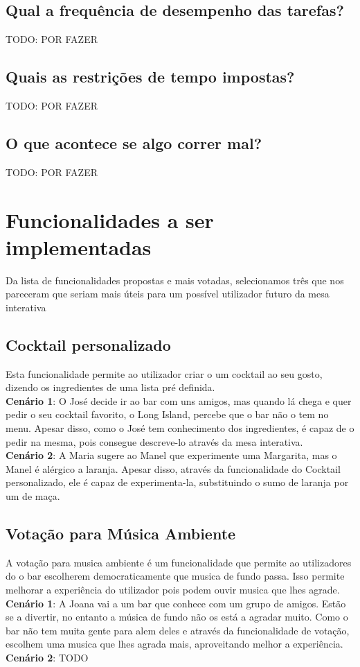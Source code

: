\documentclass{article}
\begin{document}
\subsection*{Qual a frequência de desempenho das tarefas?}
TODO: POR FAZER
\subsection*{Quais as restrições de tempo impostas?}
TODO: POR FAZER
\subsection*{O que acontece se algo correr mal?}
TODO: POR FAZER
\\

\section*{Funcionalidades a ser implementadas}

Da lista de funcionalidades propostas e mais votadas, selecionamos três que nos pareceram que seriam mais úteis para um possível utilizador futuro da mesa interativa

\subsection*{Cocktail personalizado}
Esta funcionalidade permite ao utilizador criar o um cocktail ao seu gosto, dizendo os ingredientes de uma lista pré definida.\\
\textbf{Cenário 1}: O José decide ir ao bar com uns amigos, mas quando lá chega e quer pedir o seu cocktail favorito, o Long Island, percebe que o bar não o tem no menu. Apesar disso, como o José tem conhecimento dos ingredientes, é capaz de o pedir na mesma, pois consegue descreve-lo através da mesa interativa.\\
\textbf{Cenário 2}: A Maria sugere ao Manel que experimente uma Margarita, mas o Manel é alérgico a laranja. Apesar disso, através da funcionalidade do Cocktail personalizado, ele é capaz de experimenta-la, substituindo o sumo de laranja por um de maça.
\\

\subsection{Votação para Música Ambiente}
A votação para musica ambiente é um funcionalidade que permite ao utilizadores do o bar escolherem democraticamente que musica de fundo passa. Isso permite melhorar a experiência do utilizador pois podem ouvir musica que lhes agrade.\\
\textbf{Cenário 1}: A Joana vai a um bar que conhece com um grupo de amigos. Estão se a divertir, no entanto a música de fundo não os está a agradar muito. Como o bar não tem muita gente para alem deles e através da funcionalidade de votação, escolhem uma musica que lhes agrada mais, aproveitando melhor a experiência.\\
\textbf{Cenário 2}: TODO
\end{document}

